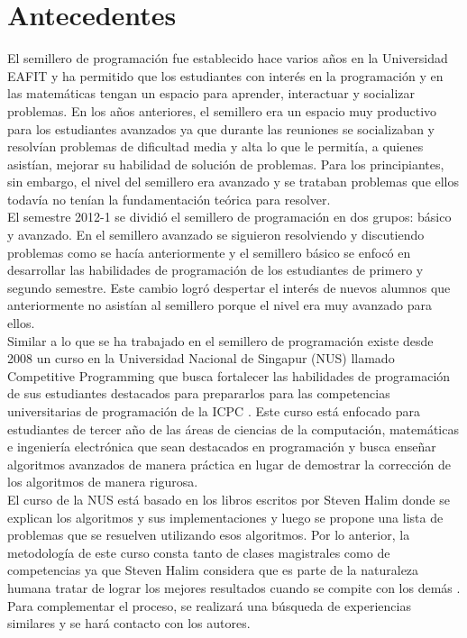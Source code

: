\documentclass[11pt, oneside]{article}
\theoremstyle{definition}
\theoremstyle{remark}
\begin{document}
\section{Antecedentes}
El semillero de programación fue establecido hace varios años en la Universidad EAFIT y ha permitido que los estudiantes con interés en la programación y en las matemáticas tengan un espacio para aprender, interactuar y socializar problemas. En los años anteriores, el semillero era un espacio muy productivo para los estudiantes avanzados ya que durante las reuniones se socializaban y resolvían problemas de dificultad media y alta lo que le permitía, a quienes asistían, mejorar su habilidad de solución de problemas. Para los principiantes, sin embargo, el nivel del semillero era avanzado y se trataban problemas que ellos todavía no tenían la fundamentación teórica para resolver.\\
El semestre 2012-1 se dividió el semillero de programación en dos grupos: básico y avanzado. En el semillero avanzado se siguieron resolviendo y discutiendo problemas como se hacía anteriormente y el semillero básico se enfocó en desarrollar las habilidades de programación de los estudiantes de primero y segundo semestre. Este cambio logró despertar el interés de nuevos alumnos que anteriormente no asistían al semillero porque el nivel era muy avanzado para ellos.\\
Similar a lo que se ha trabajado en el semillero de programación existe desde 2008 un curso en la Universidad Nacional de Singapur (NUS) llamado Competitive Programming que busca fortalecer las habilidades de programación de sus estudiantes destacados para prepararlos para las competencias universitarias de programación de la ICPC \cite{PaperHalim}. Este curso está enfocado para estudiantes de tercer año de las áreas de ciencias de la computación, matemáticas e ingeniería electrónica que sean destacados en programación y busca enseñar algoritmos avanzados de manera práctica en lugar de demostrar la corrección de los algoritmos de manera rigurosa.\\
El curso de la NUS está basado en los libros \cite{Halim, Halim2} escritos por Steven Halim donde se explican los algoritmos y sus implementaciones y luego se propone una lista de problemas que se resuelven utilizando esos algoritmos. Por lo anterior, la metodología de este curso consta tanto de clases magistrales como de competencias ya que Steven Halim considera que es parte de la naturaleza humana tratar de lograr los mejores resultados cuando se compite con los demás \cite{PaperHalim}. Para complementar el proceso, se realizará una búsqueda de experiencias similares y se hará contacto con los autores.
\end{document}
